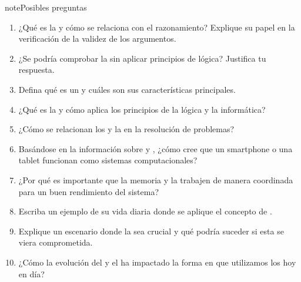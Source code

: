 \documentclass[letterpaper,10pt,spanish]{sphinxmanual}
\begin{document}
\begin{sphinxadmonition}{note}{Posibles preguntas}
\begin{enumerate}
\item {} 
\sphinxAtStartPar
¿Qué es la  y cómo se relaciona con el razonamiento? Explique su papel en la verificación de la validez de los argumentos.

\item {} 
\sphinxAtStartPar
¿Se podría comprobar la  sin aplicar principios de lógica? Justifica tu respuesta.

\item {} 
\sphinxAtStartPar
Defina qué es un  y cuáles son sus características principales.

\item {} 
\sphinxAtStartPar
¿Qué es la  y cómo aplica los principios de la lógica y la informática?

\item {} 
\sphinxAtStartPar
¿Cómo se relacionan los  y la  en la resolución de problemas?

\item {} 
\sphinxAtStartPar
Basándose en la información sobre  y , ¿cómo cree que un smartphone o una tablet funcionan como sistemas computacionales?

\item {} 
\sphinxAtStartPar
¿Por qué es importante que la memoria  y la  trabajen de manera coordinada para un buen rendimiento del sistema?

\item {} 
\sphinxAtStartPar
Escriba un ejemplo de su vida diaria donde se aplique el concepto de .

\item {} 
\sphinxAtStartPar
Explique un escenario donde la  sea crucial y qué podría suceder si esta se viera comprometida.

\item {} 
\sphinxAtStartPar
¿Cómo la evolución del  y el  ha impactado la forma en que utilizamos los  hoy en día?

\end{enumerate}
\end{sphinxadmonition}
\end{document}
